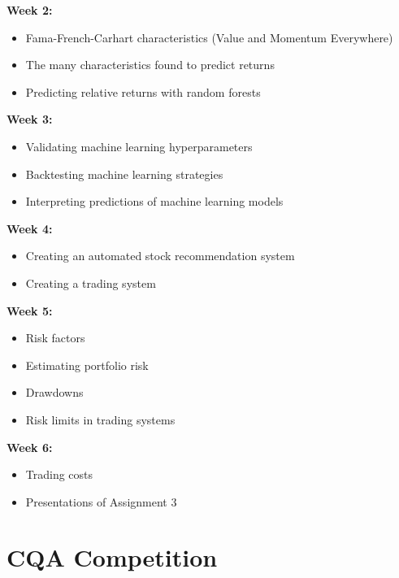 \documentclass[11pt]{article}
\begin{document}
\vspace{1em}

\noindent\textbf{Week 2:}
\begin{itemize}[topsep=0pt, itemsep=0pt]
\item Fama-French-Carhart characteristics (Value and Momentum Everywhere)
\item The many characteristics found to predict returns
\item Predicting relative returns with random forests
\end{itemize}

\newpage

\noindent\textbf{Week 3:}
\begin{itemize}[topsep=0pt, itemsep=0pt]
\item Validating machine learning hyperparameters
\item Backtesting machine learning strategies
\item Interpreting predictions of machine learning models
\end{itemize}

\vspace{1em}

\noindent\textbf{Week 4:}
\begin{itemize}[topsep=0pt, itemsep=0pt]
\item Creating an automated stock recommendation system
\item Creating a trading system
\end{itemize}

\vspace{1em}

\noindent\textbf{Week 5:}
\begin{itemize}[topsep=0pt, itemsep=0pt]
\item Risk factors
\item Estimating portfolio risk
\item Drawdowns
\item Risk limits in trading systems
\end{itemize}

\vspace{1em}

\noindent\textbf{Week 6:}
\begin{itemize}[topsep=0pt, itemsep=0pt]
\item Trading costs
\item Presentations of Assignment 3
\end{itemize}

\section{CQA Competition}
\end{document}
